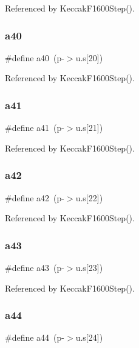 Referenced by Keccak\+F1600\+Step().

\mbox{\label{shell_8c_a6acdf1de6c488914d7454df56f898142}} 
\subsubsection{a40}
{\footnotesize\ttfamily \#define a40~(p-\/$>$u.\+s[20])}



Referenced by Keccak\+F1600\+Step().

\mbox{\label{shell_8c_a88ab0faf4cbc5a0d94c2d3239b6a7d2f}} 
\subsubsection{a41}
{\footnotesize\ttfamily \#define a41~(p-\/$>$u.\+s[21])}



Referenced by Keccak\+F1600\+Step().

\mbox{\label{shell_8c_a8a54065b72f8c16cc0d30ffc46686250}} 
\subsubsection{a42}
{\footnotesize\ttfamily \#define a42~(p-\/$>$u.\+s[22])}



Referenced by Keccak\+F1600\+Step().

\mbox{\label{shell_8c_abb8058d80926041f8b13c1a7bd2dcc96}} 
\subsubsection{a43}
{\footnotesize\ttfamily \#define a43~(p-\/$>$u.\+s[23])}



Referenced by Keccak\+F1600\+Step().

\mbox{\label{shell_8c_abffffc3abcd8431445758d81c056d472}} 
\subsubsection{a44}
{\footnotesize\ttfamily \#define a44~(p-\/$>$u.\+s[24])}



